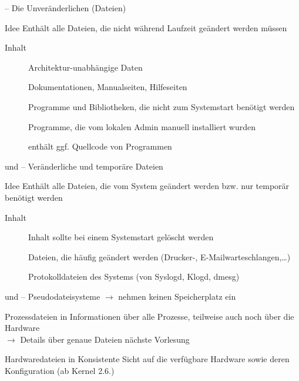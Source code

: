 \documentclass[aspectratio=43]{beamer}
\begin{document}
\begin{frame}{ -- Die Unveränderlichen (Dateien)}
  \begin{block}{Idee}
    Enthält alle Dateien, die nicht während Laufzeit geändert werden müssen
  \end{block}
  \begin{block}{Inhalt}
    \begin{description}
     \item[] Architektur-unabhängige Daten %
     \item[] Dokumentationen, Manualseiten, Hilfeseiten 
     \item[] Programme und Bibliotheken, die nicht 
					zum Systemstart benötigt werden
     \item[] Programme, die vom lokalen Admin manuell installiert wurden
     \item[] enthält ggf. Quellcode von Programmen
    \end{description}
  \end{block}
\end{frame}

\begin{frame}{ und  -- Veränderliche und temporäre Dateien }
  \begin{block}{Idee}
    Enthält alle Dateien, die vom System geändert werden bzw. nur temporär benötigt werden
  \end{block}
  \begin{block}{Inhalt}
    \begin{description}
     \item[] Inhalt sollte bei einem Systemstart gelöscht werden
     \item[] Dateien, die häufig geändert werden (Drucker-, E-Mailwarteschlangen,\dots)
     \item[] Protokolldateien des Systems (von Syslogd, Klogd, dmesg)
    \end{description}
  \end{block}
\end{frame}

\begin{frame}{ und  -- Pseudodateisysteme}
  $\rightarrow$ nehmen keinen Speicherplatz ein
  \begin{block}{Prozessdateien in }
    Informationen über alle Prozesse, teilweise auch noch über die Hardware\\
    $\rightarrow$ Details über genaue Dateien nächste Vorlesung
  \end{block}
  \begin{block}{Hardwaredateien in }
    Konsistente Sicht auf die verfügbare Hardware sowie deren Konfiguration 
    (ab Kernel 2.6.)
  \end{block}
\end{frame}
\end{document}
